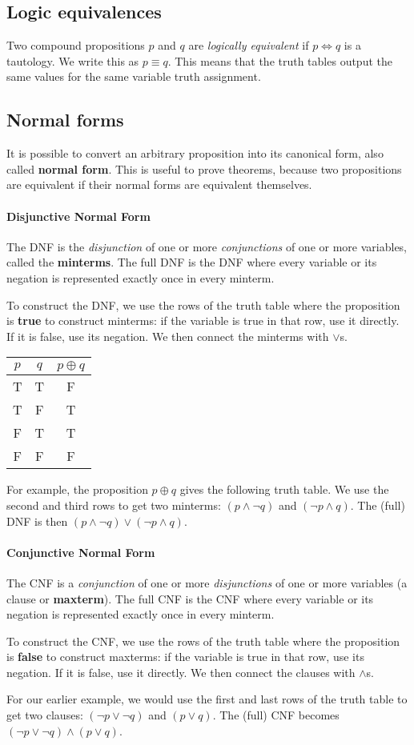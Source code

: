 \documentclass[10pt,a4paper]{book}
\begin{document}
\subsection{Logic equivalences}
Two compound propositions $p$ and $q$ are \textit{logically equivalent} if $p\Leftrightarrow q$ is a tautology. We write this as $p\equiv q$. This means that the truth tables output the same values for the same variable truth assignment. 

\subsection{Normal forms}
It is possible to convert an arbitrary proposition into its canonical form, also called \textbf{normal form}. This is useful to prove theorems, because two propositions are equivalent if their normal forms are equivalent themselves.
\paragraph*{Disjunctive Normal Form}
The DNF is the \textit{disjunction} of one or more \textit{conjunctions} of one or more variables, called the \textbf{minterms}. The full DNF is the DNF where every variable or its negation is represented exactly once in every minterm.\par 
To construct the DNF, we use the rows of the truth table where the proposition is \textbf{true} to construct minterms: if the variable is true in that row, use it directly. If it is false, use its negation. We then connect the minterms with $\lor$s.\par 
\begin{tabular}{ |c  c | c| }
\hline
 $p$ & $q$ & $p\oplus q$\\
 \hline
 T & T & F \\ 
 T & F & T \\  
 F & T & T \\
 F & F & F \\
 \hline
\end{tabular}
For example, the proposition $p\oplus q$ gives the following truth table. We use the second and third rows to get two minterms: $(p\land\neg q)$ and $(\neg p\land q)$. The (full) DNF is then $(p\land\neg q)\lor(\neg p\land q)$.
\paragraph*{Conjunctive Normal Form}
The CNF is a \textit{conjunction} of one or more \textit{disjunctions} of one or more variables (a clause or \textbf{maxterm}). The full CNF is the CNF where every variable or its negation is represented exactly once in every minterm.\par
To construct the CNF, we use the rows of the truth table where the proposition is \textbf{false} to construct maxterms: if the variable is true in that row, use its negation. If it is false, use it directly. We then connect the clauses with $\land$s.\par 
For our earlier example, we would use the first and last rows of the truth table to get two clauses: $(\neg p\lor\neg q)$ and $(p\lor q)$. The (full) CNF becomes $(\neg p\lor\neg q)\land(p\lor q)$.
\end{document}
